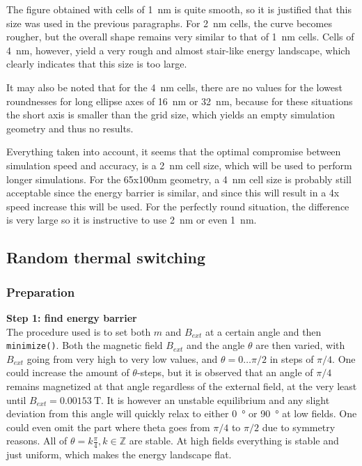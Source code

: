 \documentclass[10pt,a4paper]{article}
\newcommand{\code}[1]{\texttt{#1}}
\begin{document}
The figure obtained with cells of \SI{1}{\nano\metre} is quite smooth, so it is justified that this size was used in the previous paragraphs. For \SI{2}{\nano\metre} cells, the curve becomes rougher, but the overall shape remains very similar to that of \SI{1}{\nano\metre} cells. Cells of \SI{4}{\nano\metre}, however, yield a very rough and almost stair-like energy landscape, which clearly indicates that this size is too large. \par
It may also be noted that for the \SI{4}{\nano\metre} cells, there are no values for the lowest roundnesses for long ellipse axes of \SI{16}{\nano\metre} or \SI{32}{\nano\metre}, because for these situations the short axis is smaller than the grid size, which yields an empty simulation geometry and thus no results. \par
Everything taken into account, it seems that the optimal compromise between simulation speed and accuracy, is a \SI{2}{\nano\metre} cell size, which will be used to perform longer simulations. For the 65x100nm geometry, a \SI{4}{\nano\metre} cell size is probably still acceptable since the energy barrier is similar, and since this will result in a 4x speed increase this will be used. For the perfectly round situation, the difference is very large so it is instructive to use \SI{2}{\nano\metre} or even \SI{1}{\nano\metre}.





\subsection{Random thermal switching}
\subsubsection{Preparation}
\textbf{Step 1: find energy barrier} \\
The procedure used is to set both $m$ and $B_{ext}$ at a certain angle and then \code{minimize()}. Both the magnetic field $B_{ext}$ and the angle $\theta$ are then varied, with $B_{ext}$ going from very high to very low values, and $\theta=0\dots\pi/2$ in steps of $\pi/4$. One could increase the amount of $\theta$-steps, but it is observed that an angle of $\pi/4$ remains magnetized at that angle regardless of the external field, at the very least until $B_{ext} = \SI{0.00153}{\tesla}$. It is however an unstable equilibrium and any slight deviation from this angle will quickly relax to either \SI{0}{\degree} or \SI{90}{\degree} at low fields.
One could even omit the part where theta goes from $\pi/4$ to $\pi/2$ due to symmetry reasons.
All of $\theta = k\frac{\pi}{4} , k\in\mathbb{Z}$ are stable.
At high fields everything is stable and just uniform, which makes the energy landscape flat.
\end{document}
